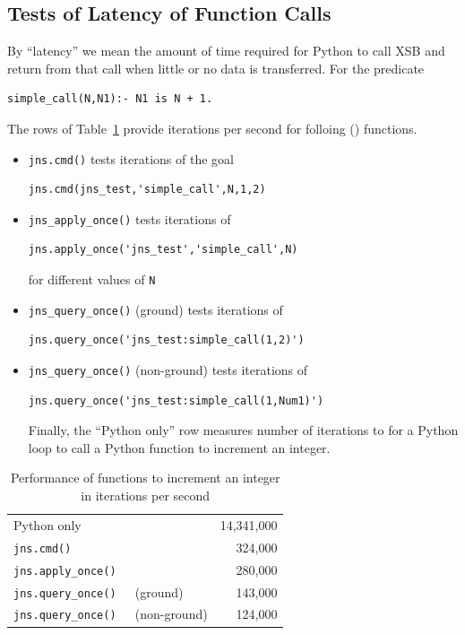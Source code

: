 \subsection{Tests of Latency of Function Calls}
By ``latency'' we mean the amount of time required for Python to call
XSB and return from that call when little or no data is transferred.
For the predicate
\begin{verbatim}
simple_call(N,N1):- N1 is N + 1.
\end{verbatim}
The rows of Table~\ref{table:janus-py-latency} provide iterations per
second for folloing \januspy() functions.
\begin{itemize}
\item {\tt jns.cmd()} tests iterations of the goal
\begin{verbatim}
jns.cmd(jns_test,'simple_call',N,1,2)
\end{verbatim}
\item {\tt jns\_apply\_once()} tests iterations of
\begin{verbatim}
jns.apply_once('jns_test','simple_call',N)
\end{verbatim}
for different values of {\tt N}
\item {\tt jns\_query\_once()} (ground) tests iterations of 
\begin{verbatim}
jns.query_once('jns_test:simple_call(1,2)')
\end{verbatim}
\item {\tt jns\_query\_once()} (non-ground) tests iterations of 
\begin{verbatim}
jns.query_once('jns_test:simple_call(1,Num1)')
\end{verbatim}
Finally, the ``Python only'' row measures number of iterations to for
a Python loop to call a Python function to increment an integer.
\end{itemize}

\begin{table}[hbt] \label{table:janus-py-latency}
  \begin{centering}
\begin{tabular}{llr} \hline
Python only               &                   & 14,341,000 \\ 
{\tt jns.cmd()}           &                   &    324,000\\
{\tt jns.apply\_once()}   &                   &    280,000\\
{\tt jns.query\_once() }  & (ground)          &    143,000 \\
{\tt jns.query\_once()}   & (non-ground)      &    124,000 \\  \hline 
\end{tabular}        
\caption{Performance of functions to increment an integer in
  iterations per second}
  \end{centering}
\end{table}

